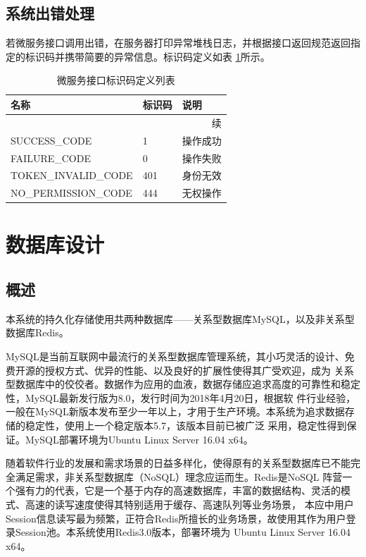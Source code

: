 \documentclass[titlepage,UTF8,linespread=1.5]{ctexart}
\begin{document}
\subsection{系统出错处理}
若微服务接口调用出错，在服务器打印异常堆栈日志，并根据接口返回规范返回指定的标识码并携带简要的异常信息。标识码定义如表
\ref{tab:rest-result-code}所示。\par
\begin{longtable}{|p{15em}|p{5em}|p{10em}|}
    \caption{微服务接口标识码定义列表}\label{tab:rest-result-code} \\\hline
    名称                 & 标识码 & 说明                           \\\hline
    \endfirsthead
    \multicolumn{3}{r}{{续\tablename\thetable{}}}                  \\\hline
    \endhead
    SUCCESS\_CODE        & 1      & 操作成功                       \\\hline
    FAILURE\_CODE        & 0      & 操作失败                       \\\hline
    TOKEN\_INVALID\_CODE & 401    & 身份无效                       \\\hline
    NO\_PERMISSION\_CODE & 444    & 无权操作                       \\\hline
\end{longtable}

\clearpage

\section{数据库设计}
\subsection{概述}
本系统的持久化存储使用共两种数据库——关系型数据库MySQL，以及非关系型数据库Redis。\par
MySQL是当前互联网中最流行的关系型数据库管理系统，其小巧灵活的设计、免费开源的授权方式、优异的性能、以及良好的扩展性使得其广受欢迎，成为
关系型数据库中的佼佼者。数据作为应用的血液，数据存储应追求高度的可靠性和稳定性，MySQL最新发行版为8.0，发行时间为2018年4月20日，根据软
件行业经验，一般在MySQL新版本发布至少一年以上，才用于生产环境。本系统为追求数据存储的稳定性，使用上一个稳定版本5.7，该版本目前已被广泛
采用，稳定性得到保证。MySQL部署环境为Ubuntu Linux Server 16.04 x64。\par
随着软件行业的发展和需求场景的日益多样化，使得原有的关系型数据库已不能完全满足需求，非关系型数据库（NoSQL）理念应运而生。Redis是NoSQL
阵营一个强有力的代表，它是一个基于内存的高速数据库，丰富的数据结构、灵活的模式、高速的读写速度使得其特别适用于缓存、高速队列等业务场景，
本应中用户Session信息读写最为频繁，正符合Redis所擅长的业务场景，故使用其作为用户登录Session池。本系统使用Redis3.0版本，部署环境为
Ubuntu Linux Server 16.04 x64。\par
\end{document}
